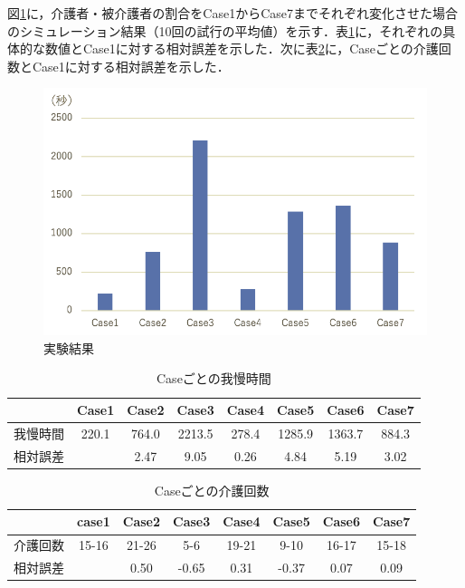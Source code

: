 図\ref{result_v1}に，介護者・被介護者の割合をCase1からCase7までそれぞれ変化させた場合のシミュレーション結果（10回の試行の平均値）を示す．表\ref{relative_error}に，それぞれの具体的な数値とCase1に対する相対誤差を示した．次に表\ref{number_of_care}に，Caseごとの介護回数とCase1に対する相対誤差を示した．

\begin{figure}[htb]
\begin{center}
 \includegraphics[scale=0.5]{figures/result_v1}
 \caption[実験結果]{実験結果 \label{result_v1}}
\end{center}
\end{figure}

\begin{table}[htb]
  \caption[Caseごとの我慢時間]{Caseごとの我慢時間}
  \label{relative_error}
  \centering
  \begin{tabular}{r|c|c|c|c|c|c|c}
     & Case1 & Case2 & Case3 & Case4 & Case5 & Case6 & Case7 \\ \hline
    我慢時間 & 220.1 & 764.0 & 2213.5 & 278.4 & 1285.9 & 1363.7 & 884.3 \\
    相対誤差 & & 2.47 & 9.05 & 0.26 & 4.84 & 5.19 & 3.02 \\
    \end{tabular}
\end{table}


\begin{table}[htb]
  \caption[Caseごとの介護回数]{Caseごとの介護回数}
  \label{number_of_care}
  \centering
  \begin{tabular}{r|c|c|c|c|c|c|c}
     & case1 & Case2 & Case3 & Case4 & Case5 & Case6 & Case7\\ \hline
    介護回数 & 15-16 & 21-26 & 5-6 & 19-21 & 9-10 & 16-17 & 15-18\\
    相対誤差 & & 0.50 & -0.65 & 0.31 & -0.37 & 0.07 & 0.09 \\
    \end{tabular}
\end{table}

